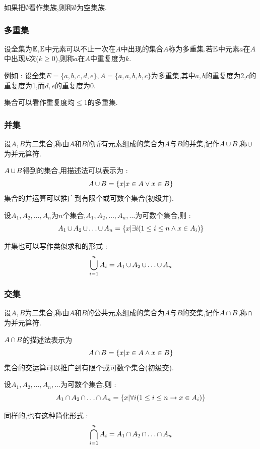 {{{如果把$\emptyset$看作集族,则称$\emptyset$为空集族.
}%

\subsubsection{多重集}{
  设全集为$\mathEverythingCollection$,$\mathEverythingCollection$中元素可以不止一次在$A$中出现的集合$A$称为多重集.若$\mathEverythingCollection$中元素$a$在$A$中出现$k$次($k \geq 0$),则称$a$在$A$中重复度为$k$.

  例如 : 设全集$E = \{a,b,c,d,e\},A = \{a,a,b,b,c\}$为多重集,其中$a,b$的重复度为2,$c$的重复度为1,而$d,e$的重复度为0.

  集合可以看作重复度均$\leq 1$的多重集.
}%

\subsubsection{并集}{
  设$A,B$为二集合,称由$A$和$B$的所有元素组成的集合为$A$与$B$的并集,记作$A \unionSet B$,称$\unionSet$为并元算符.

  $A \unionSet B$得到的集合,用描述法可以表示为 : $$
    A \unionSet B = \{x | x \in A \lor x \in B\}
  $$
  集合的并运算可以推广到有限个或可数个集合(初级并).

  设$A_1,A_2,\dots,A_n$为$n$个集合,$A_1,A_2,\dots,A_n,\dots$为可数个集合,则 : $$
    A_1 \unionSet A_2 \unionSet \dots \unionSet A_n = \{x | \exists i (1 \leq i \leq n \land x \in A_i)\}
  $$

  并集也可以写作类似求和的形式 : $$
    \updownUnion{n}{i = 1}A_i = A_1 \unionSet A_2 \unionSet \dots \unionSet A_n
  $$

}%

\subsubsection{交集}{
  设$A,B$为二集合,称由$A$和$B$的公共元素组成的集合为$A$与$B$的交集,记作$A \intersectionSet B$,称$\intersectionSet$为并元算符.

  $A \intersectionSet B$的描述法表示为$$
    A \intersectionSet B = \{x | x \in A \land x \in B\}
  $$
  集合的交运算可以推广到有限个或可数个集合(初级交).

  设$A_1,A_2,\dots,A_n,\dots$为可数个集合,则 : $$
    A_1 \intersectionSet A_2 \intersectionSet \dots \intersectionSet A_n = \{x | \forall i (1 \leq i \leq n \to x \in A_i)\}
  $$

  同样的,也有这种简化形式 : $$
    \bigcap\limits_{i = 1}^{n}A_i = A_1 \intersectionSet A_2 \intersectionSet \dots \intersectionSet A_n
  $$
}%

}}
